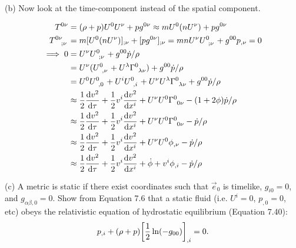 \documentclass[gr-notes.tex]{subfiles}
\begin{document}
(b) Now look at the time-component instead of the spatial component.

\begin{align*}
  T^{0\nu} &=
  (\rho + p) U^0 U^\nu + p g^{0\nu} \approx
  m U^0 (n U^\nu) + p g^{0\nu}
  \\
  \tensor{T}{^{0\nu}_{;\nu}} &=
  m [U^0 (n U^\nu)]_{;\nu} + [p g^{0\nu}]_{;\nu} =
  m n U^\nu \tensor{U}{^0_{;\nu}} + g^{00} p_{,\nu} =
  0
  \\ \implies
  0 &=
  U^\nu \tensor{U}{^0_{;\nu}} + g^{00} \dot{p} / \rho
  \\ &=
  U^\nu (\tensor{U}{^0_{,\nu}} + U^\lambda \tensor{\Gamma}{^0_{\lambda\nu}}) +
  g^{00} \dot{p} / \rho
  \\ &=
  U^0 \tensor{U}{^0_{,0}} +
  U^i \tensor{U}{^0_{,i}} +
  U^\nu U^\lambda \tensor{\Gamma}{^0_{\lambda\nu}} +
  g^{00} \dot{p} / \rho
  \\ &\approx
  \frac{1}{2} \dv{v^2}{\tau} +
  \frac{1}{2} v^i \dv{v^2}{x^i} +
  U^\nu U^0 \tensor{\Gamma}{^0_{0\nu}} -
  (1 + 2\phi) \dot{p} / \rho
  \\ &\approx
  \frac{1}{2} \dv{v^2}{\tau} +
  \frac{1}{2} v^i \dv{v^2}{x^i} +
  U^\nu U^0 \tensor{\Gamma}{^0_{0\nu}} -
  \dot{p} / \rho
  \\ &\approx
  \frac{1}{2} \dv{v^2}{\tau} +
  \frac{1}{2} v^i \dv{v^2}{x^i} +
  U^\nu U^0 \phi_{,\nu} -
  \dot{p} / \rho
  \\ &\approx
  \frac{1}{2} \dv{v^2}{\tau} +
  \frac{1}{2} v^i \dv{v^2}{x^i} +
  \dot{\phi} + v^i \phi_{,i} -
  \dot{p} / \rho
\end{align*}

(c) A metric is static if there exist coordinates such that $\vec{e}_0$ is timelike, $g_{i0} = 0$, and $g_{\alpha\beta,0} = 0$. Show from Equation 7.6 that a static fluid (i.e. $U^i = 0$, $p_{,0} = 0$, etc) obeys the relativistic equation of hydrostatic equilibrium (Equation 7.40):
%
\begin{displaymath}
  p_{,i} + (\rho + p) \qty[ \frac{1}{2} \ln(-g_{00}) ]_{,i} = 0.
\end{displaymath}
\end{document}
